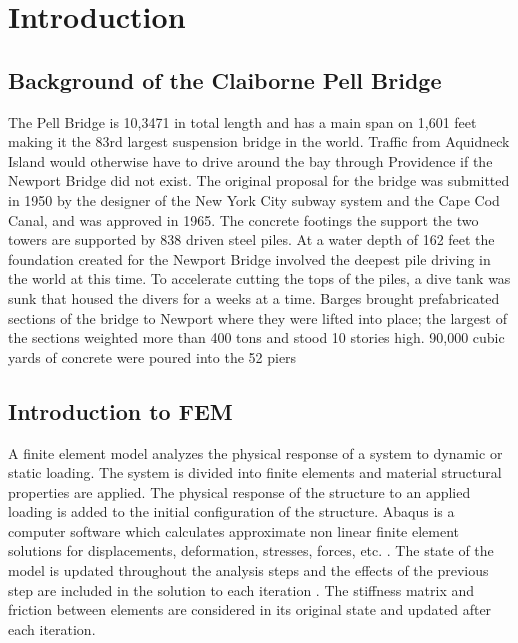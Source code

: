 
\section{Introduction}

\label{sec:examples}

\subsection{Background of the Claiborne Pell Bridge}

The Pell Bridge is 10,3471 in total length and has a main span on 1,601 feet making it the 83rd largest suspension bridge in the world. Traffic from
Aquidneck Island would otherwise have to drive around the bay through Providence if the Newport Bridge did not exist. The original proposal for the
bridge was submitted in 1950 by the designer of the New York City subway system and the Cape Cod Canal, and was approved in 1965. The concrete footings
the support the two towers are supported by 838 driven steel piles. At a water depth of 162 feet the foundation created for the Newport Bridge
involved the deepest pile driving in the world at this time. To accelerate cutting the tops of the piles, a dive tank was sunk that housed the divers
for a weeks at a time. Barges brought prefabricated sections of the bridge to Newport where they were lifted into place; the largest of the sections
weighted more than 400 tons and stood 10 stories high. 90,000 cubic yards of concrete were poured into the 52 piers \cite{RIBTA}\\ 

\subsection{Introduction to FEM}

A finite element model analyzes the physical response of a system to dynamic or static loading. The system is divided into finite elements and material
structural properties are applied. The physical response of the structure to an applied loading is added to the initial configuration of the structure.
Abaqus is a computer software which calculates approximate non linear finite element solutions for displacements, deformation, stresses, forces, etc. .
The state of the model is updated throughout the analysis steps and the effects of the previous step are included in the solution to each iteration
\cite{Abaqus}. The stiffness matrix and friction between elements are considered in its original state and updated after each iteration. \cite{Manoj}\\

